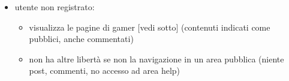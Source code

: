 \documentclass{article}
\begin{document}
  \begin{itemize}

    \item utente non registrato:
    \begin{itemize}
      \item visualizza le pagine di gamer [vedi sotto] (contenuti indicati come pubblici, anche commentati)
      \item non ha altre libertà se non la navigazione in un area pubblica (niente post, commenti, no accesso ad area help)
    \end{itemize}


\end{itemize}
\end{document}
